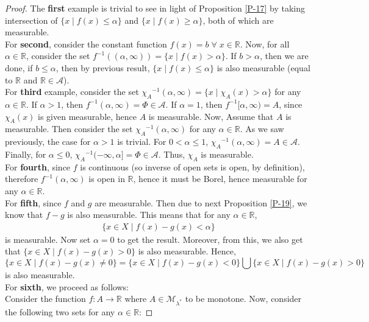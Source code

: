 \documentclass{article}
\theoremstyle{definition}
\theoremstyle{remark}
\theoremstyle{definition}
\theoremstyle{definition}
\theoremstyle{definition}
\newcommand{\bunion}{\bigcup}
\newcommand{\where}{\;\vert\;}
\newcommand{\R}{\mathbb{R}}
\newcommand{\alg}[1]{\mathscr{#1}}
\newcommand{\set}[1]{\mathscr{#1}}
\newcommand{\msigm}[1]{\set{M}_{#1}}
\newcommand{\inv}[1]{{#1}^{-1}}
\begin{document}
\begin{proof}
	The\textbf{ first }example is trivial to see in light of Proposition \ref{P-17} by taking intersection of $ \{x\where f(x)\le \alpha\} $ and $ \{x\where f(x) \ge \alpha\} $, both of which are measurable.\\
	For \textbf{second}, consider the constant function $ f(x) = b \;\forall \; x \in \R$. Now, for all $ \alpha \in\R $, consider the set $ \inv{f}((\alpha,\infty)) =  \{x\where f(x)>\alpha\}$.  If $ b > \alpha $, then we are done, if $ b\le \alpha $, then by previous result, $ \{x\where f(x) \le \alpha\} $ is also measurable (equal to $ \R $ and $ \R\in \alg{A} $).\\
	For \textbf{third} example, consider the set $ \inv{\chi_A}(\alpha,\infty) = \{x\where \chi_A(x) > \alpha\} $ for any $ \alpha \in \R $. If $ \alpha >1 $, then $ \inv{f}(\alpha,\infty) =  \Phi \in \alg{A}$. If $ \alpha = 1 $, then $\inv{f}[\alpha,\infty) = A$, since $ \chi_A(x) $ is given measurable, hence $ A $ is measurable. Now, Assume that $ A $ is measurable. Then consider the set $ \inv{\chi_A}(\alpha,\infty) $ for any $ \alpha\in \R $. As we saw previously, the case for $ \alpha > 1 $ is trivial. For $ 0< \alpha \le 1 $, $ \inv{\chi_A}(\alpha,\infty) = A \in \alg{A}$. Finally, for $ \alpha\le 0 $, $ \inv{\chi_A} (-\infty,\alpha]  = \Phi \in \alg{A}$. Thus, $ \chi_A $ is measurable.\\
	For \textbf{fourth}, since $ f $ is continuous (so inverse of open sets is open, by definition), therefore $ \inv{f} (\alpha,\infty) $ is open in $ \R $, hence it must be Borel, hence measurable for any $ \alpha \in \R $.\\
	For \textbf{fifth}, since $ f $ and $ g $ are measurable. Then due to next Proposition \ref{P-19}, we know that $ f-g $ is also measurable. This means that for any $ \alpha \in \R $,
	\begin{equation*}
		\begin{split}
			\{x\in X\where f(x)-g(x) < \alpha\}
		\end{split}
	\end{equation*}
is measurable. Now set $ \alpha = 0 $ to get the result. Moreover, from this, we also get that $ \{x\in X\where f(x) -g(x) >0\} $ is also measurable. Hence,
\[\{x\in X \where f(x)-g(x)\neq 0\} = \{x\in X\where f(x)- g(x) < 0\} \bunion \{x\in X \where f(x)-g(x) > 0\}\]
is also measurable.\\
For \textbf{sixth}, we proceed as follows:\\
Consider the function $ f : A \to \R $ where $ A \in \msigm{\lambda^*}$ to be monotone. Now, consider the following two sets for any $ \alpha \in \R $:

\end{proof}
\end{document}
